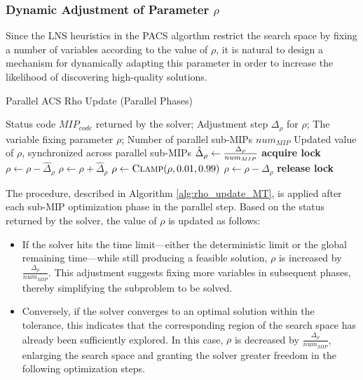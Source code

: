 \subsubsection{Dynamic Adjustment of Parameter $\rho$}
Since the LNS heuristics in the PACS algorthm restrict the search space by fixing a number of variables according to the value of $\rho$, it is natural to design a mechanism for dynamically adapting this parameter in order to increase the likelihood of discovering high-quality solutions.  
\begin{algorithm}[H]
\caption{Parallel ACS Rho Update (Parallel Phases)}\label{alg:rho_update_MT}
\begin{algorithmic}[1]
\Require Status code $MIP_{code}$ returned by the solver; Adjustment step $\Delta_\rho$ for $\rho$; The variable fixing parameter $\rho$; Number of parallel sub-MIPs $num_{MIP}$
\Ensure Updated value of $\rho$, synchronized across parallel sub-MIPs
    \State $\hat\Delta_\rho \gets {\Delta_\rho \over{num_{MIP}}}$
    \State \textbf{acquire lock}
        \State $\rho \gets \rho - \hat\Delta_\rho$
    \EndIf
        \State $\rho \gets \rho + \hat\Delta_\rho$
    \EndIf
    \State $\rho \gets \Call{Clamp}{\rho,0.01,0.99}$
        \State $\rho \gets \rho - \Delta_\rho$
    \EndIf
    \State \textbf{release lock}
\EndFunction
\end{algorithmic}
\end{algorithm}
The procedure, described in Algorithm \ref{alg:rho_update_MT}, is applied after each sub-MIP optimization phase in the parallel step. Based on the status returned by the solver, the value of $\rho$ is updated as follows:
\begin{itemize}
    \item  If the solver hits the time limit—either the deterministic limit or the global remaining time—while still producing a feasible solution, $\rho$ is increased by $\frac{\Delta_\rho}{num_{MIP}}$. This adjustment suggests fixing more variables in subsequent phases, thereby simplifying the subproblem to be solved. 
    \item Conversely, if the solver converges to an optimal solution within the tolerance, this indicates that the corresponding region of the search space has already been sufficiently explored. In this case, $\rho$ is decreased by $\frac{\Delta_\rho}{num_{MIP}}$, enlarging the search space and granting the solver greater freedom in the following optimization steps.  
\end{itemize}
